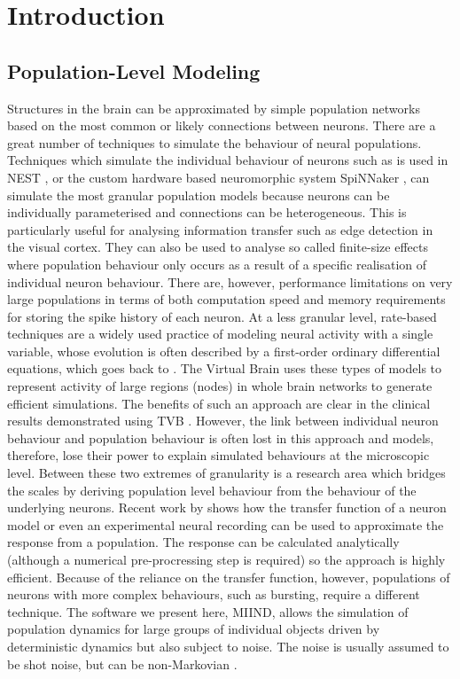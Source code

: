 \documentclass[utf8]{frontiersSCNS} %
\begin{document}
\section{Introduction}

\subsection{Population-Level Modeling}
Structures in the brain can be approximated by simple population networks based on the most common or likely connections between neurons. There are a great number of techniques to simulate the behaviour of neural populations.
Techniques which simulate the individual behaviour of neurons such as is used in NEST \citep{Gewaltig:NEST}, or the custom hardware based neuromorphic system SpiNNaker \citep{9fed179f612a405b8801b67ef74bc737}, can simulate the most granular population models because neurons can be individually parameterised and connections can be heterogeneous. This is particularly useful for analysing information transfer such as edge detection in the visual cortex. They can also be used to analyse so called finite-size effects where population behaviour only occurs as a result of a specific realisation of individual neuron behaviour. There are, however, performance limitations on very large populations in terms of both computation speed and memory requirements for storing the spike history of each neuron. 
At a less granular level, rate-based techniques are a widely used practice of modeling neural activity with a single variable, whose evolution is often described by a first-order ordinary differential equations, which goes back to \cite{wilson1972excitatory}. The Virtual Brain \citep{sanz2013virtual,jirsa2014nature} uses these types of models to represent activity of large regions (nodes) in whole brain networks to generate efficient simulations. The benefits of such an approach are clear in the clinical results demonstrated using TVB \citep{proix2017individual}. However, the link between individual neuron behaviour and population behaviour is often lost in this approach and models, therefore, lose their power to explain simulated behaviours at the microscopic level.
Between these two extremes of granularity is a research area which bridges the scales by deriving population level behaviour from the behaviour of the underlying neurons. Recent work by \cite{carlu2020mean} shows how the transfer function of a neuron model or even an experimental neural recording can be used to approximate the response from a population. The response can be calculated analytically (although a numerical pre-procressing step is required) so the approach is highly efficient. Because of the reliance on the transfer function, however, populations of neurons with more complex behaviours, such as bursting, require a different technique. The software we present here, MIIND, allows the simulation of population dynamics for large groups of individual objects driven by deterministic dynamics but also subject to noise. The noise is usually assumed to be shot noise, but can be non-Markovian \citep{lai2017population}. 
\end{document}
